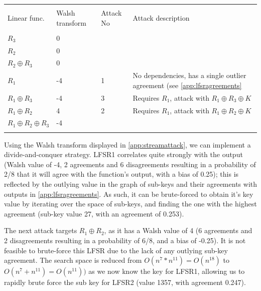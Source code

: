\documentclass[british,11pt,a4paper]{article}
\begin{document}
\begin{center}
	\begin{tabular}{lllp{6.5cm}}\label{tab:streamattack} \\
		\toprule \\
		Linear func.                  & Walsh transform & Attack No & Attack description                                           \\
		\midrule \\
		\(R_3\) & 0 \\
		\(R_2\)                       & 0               &           &                                                              \\
		\(R_2 \oplus R_3\)            & 0               &           &                                                              \\
		\(R_1\)                       & -4              & 1         & No dependencies, has a single outlier agreement (see \autoref{app:lfsragreements} \\
		\(R_1 \oplus R_3\)            & -4              & 3         & Requires \(R_1\), attack with \(R_1 \oplus R_3 \oplus K\)    \\
		\(R_1 \oplus R_2\)            & 4               & 2         & Requires \(R_1\), attack with \(R_1 \oplus R_2 \oplus K\)    \\
		\(R_1 \oplus R_2 \oplus R_3\) & -4              &           &                                                              \\

		\bottomrule \\
	\end{tabular}
\end{center}
Using the Walsh transform displayed in \autoref{app:streamattack}, we can implement a divide-and-conquer strategy.
LFSR1 correlates quite strongly with the output (Walsh value of -4, 2 agreements and 6 disagreements resulting in a probability of 2/8 that it will agree with the function's output, with a bias of 0.25); this is reflected by the outlying value in the graph of sub-keys and their agreements with outputs in \autoref{app:lfsragreements}. As such, it can be brute-forced to obtain it's key value by iterating over the space of sub-keys, and finding the one with the highest agreement (sub-key value 27, with an agreement of 0.253).

The next attack targets \(R_1 \oplus R_2\), as it has a Walsh value of 4 (6 agreements and 2 disagreements resulting in a probability of 6/8, and a bias of -0.25). It is not feasible to brute-force this LFSR due to the lack of any outlying sub-key agreement.
The search space is reduced from \(O(n^{7} * n^{11})=O(n^{18})\) to \(O(n^7 + n^{11})=O(n^{11}))\) as we now know the key for LFSR1, allowing us to rapidly brute force the sub key for LFSR2 (value 1357, with agreement 0.247).
\end{document}
